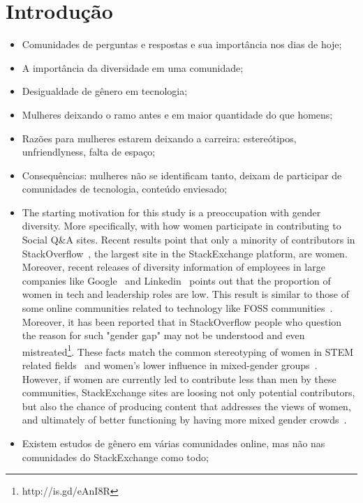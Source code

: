 \chapter{Introdução}

\begin{itemize}
	\item Comunidades de perguntas e respostas e sua importância nos dias de hoje;
	\item A importância da diversidade em uma comunidade;
	\item Desigualdade de gênero em tecnologia;
	\item Mulheres deixando o ramo antes e em maior quantidade do que homens;
	\item Razões para mulheres estarem deixando a carreira: estereótipos, unfriendlyness, falta de espaço;
	\item Consequências: mulheres não se identificam tanto, deixam de participar de comunidades de tecnologia, conteúdo enviesado;
	\item The starting motivation for this study is a preoccupation with gender diversity. More specifically, with how women participate in contributing to Social Q\&A sites. Recent results point that only a minority of contributors in StackOverflow~\cite{Vasilescu27092013}, the largest site in the StackExchange platform, are women. Moreover, recent releases of diversity information of employees in large companies like Google~\cite{google:report} and Linkedin~\cite{linkedin:report} points out that the proportion of women in tech and leadership roles are low. This result is similar to those of some online communities related to technology like FOSS communities~\cite{rustad2011suck}. Moreover, it has been reported that in StackOverflow people who question the reason for such "gender gap" may not be understood and even mistreated\footnote{http://is.gd/eAnI8R}. These facts match the common stereotyping of women in STEM related fields~\cite{spencer1999stereotype} and women's lower influence in mixed-gender groups~\cite{karpowitz2012gender}. However, if women are currently led to contribute less than men by these communities, StackExchange sites are loosing not only potential contributors, but also the chance of producing content that addresses the views of women, and ultimately of better functioning by having more mixed gender crowds~\cite{marshall1975boys}.
	\item Existem estudos de gênero em várias comunidades online, mas não nas comunidades do StackExchange como todo;

\end{itemize}
